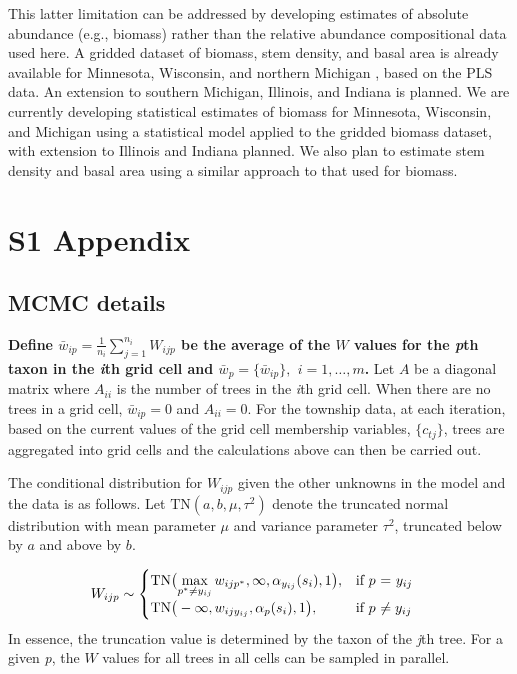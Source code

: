 \documentclass[10pt,letterpaper]{article}
\begin{document}
This latter limitation can be addressed by developing estimates of
absolute abundance (e.g., biomass) rather than the relative abundance
compositional data used here. A gridded dataset of biomass, stem density,
and basal area is already available for Minnesota, Wisconsin, and
northern Michigan \cite{goring2015composition}, based on the PLS
data. An extension to southern Michigan, Illinois, and Indiana is
planned. We are currently developing statistical estimates of biomass
for Minnesota, Wisconsin, and Michigan using a statistical model applied
to the gridded biomass dataset, with extension to Illinois and Indiana
planned. We also plan to estimate stem density and basal area using
a similar approach to that used for biomass. 


\section*{S1 Appendix}
\label{SI}

\subsection*{MCMC details}

{\bf Define $\bar{w}_{ip}=\frac{1}{n_{i}}{\displaystyle \sum_{j=1}^{n_{i}}W_{ijp}}$
be the average of the $W$ values for the \emph{p}th taxon in the \emph{i}th
grid cell and $\bar{w}_{p}=\{\bar{w}_{ip}\},$ $i=1,\ldots,m$.} Let
$A$ be a diagonal matrix where $A_{ii}$ is the number of trees in
the \emph{i}th grid cell. When there are no trees in a grid cell, $\bar{w}_{ip}=0$
and $A_{ii}=0$. For the township data, at each iteration, based on
the current values of the grid cell membership variables, $\{c_{tj}\}$,
trees are aggregated into grid cells and the calculations above can
then be carried out.

The conditional distribution for $W_{ijp}$ given the other unknowns
in the model and the data is as follows. Let $\mbox{TN}(a,b,\mu,\tau^{2})$
denote the truncated normal distribution with mean parameter $\mu$
and variance parameter $\tau^{2}$, truncated below by $a$ and above
by $b$. 

\begin{align}
W_{ijp} & \sim\begin{cases}
\mbox{TN}\big({\displaystyle \max_{p^{*}\neq y_{ij}}w_{ijp^{*}},\infty,\alpha_{y_{ij}}(s_{i}),1\big),} & \mbox{if }p\mbox{ = \ensuremath{y_{ij}}}\\
\mbox{TN}\big(-\infty,w_{ijy_{ij}},\alpha_{p}(s_{i}),1\big), & \mbox{if }p\mbox{ \ensuremath{\neq y_{ij}}}
\end{cases}
\end{align}
In essence, the truncation value is determined by the taxon of the
\emph{j}th tree. For a given \emph{p}, the $W$ values for all trees in all
cells can be sampled in parallel. 
\end{document}
